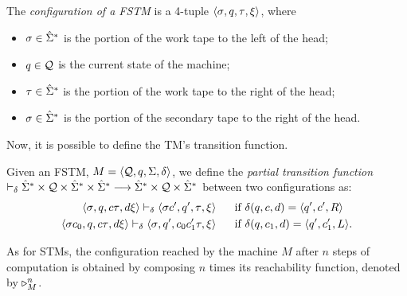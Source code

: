 \begin{defn}\label{df:TMConfiguration}
The \emph{configuration of a FSTM} is a 4-tuple
$\langle \textcolor{black}{\sigma}, \textcolor{black}{q}, \textcolor{black}{\tau},\textcolor{black}{\xi}\rangle$, where
\begin{itemize}
\itemsep0em

\item $\textcolor{black}{\sigma} \in \textcolor{black}{\hat{\Sigma}^*}$ is the portion of the work tape to the left of the head;

\item $\textcolor{black}{q} \in \textcolor{black}{\mathcal{Q}}$ is the current state of the machine;

\item $\textcolor{black}{\tau} \in \textcolor{black}{\hat{\Sigma}^*}$ is the portion
of the work tape to the right of the head;

\item $\textcolor{black}{\sigma} \in \textcolor{black}{\hat{\Sigma}^*}$ is the portion
of the secondary tape to the right of the head.

\end{itemize}
\end{defn}

\noindent
Now, it is possible to define the TM's transition
function.




\begin{defn}\label{df:FSTMTransition}
Given an FSTM, $M=\langle
\textcolor{black}{\mathcal{Q}}, \textcolor{black}{q}, \textcolor{black}{\Sigma}, \textcolor{black}{\delta}\rangle$,
we define the \emph{partial transition function}
$\vdash_{\delta} \textcolor{black}{\hat{\Sigma}^*} \times
\textcolor{black}{\mathcal{Q}} \times
\textcolor{black}{\hat{\Sigma}^*}\times
\textcolor{black}{\hat{\Sigma}^*}
\longrightarrow
\textcolor{black}{\hat{\Sigma}^*} \times
\textcolor{black}{\mathcal{Q}} \times
\textcolor{black}{\hat{\Sigma}^*}$
between two configurations as:
%
\begin{align*}
\langle \m{\sigma}, \m{q}, \m{c\tau}, \m{d}\xi \rangle
%
\tmstep_{\m{\delta}}
%
\langle \m{\sigma c'}, \m{q'}, \m{\tau}, \xi\rangle
%
\ \ \ \ \ &\text{if} \ \m{\delta}(\m{q},\m{c}, \m{d}) =
\langle \m{q'}, \m{c'}, \m{R}\rangle \\
%
%
%
\langle \m{\sigma c_0},
\m{q}, \m{c\tau}, \m{d}\xi\rangle
\tmstep_{\m{\delta}}
\langle \m{\sigma},
\m{q'}, \m{c_0c_1'\tau, \xi}
\rangle
%
\ \ \ \ \ &\text{if} \ \m{\delta}(\m{q}, \m{c_1}, \m{d}) = \langle
\m{q'}, \m{c_1'}, \m{L}\rangle.
%
%
%
%
\end{align*}
%
\end{defn}
%
\noindent
As for STMs, the configuration reached by the machine
$M$ after $n$ steps of computation is obtained
by composing $n$ times
its reachability function, denoted by $\triangleright^n_M$.


